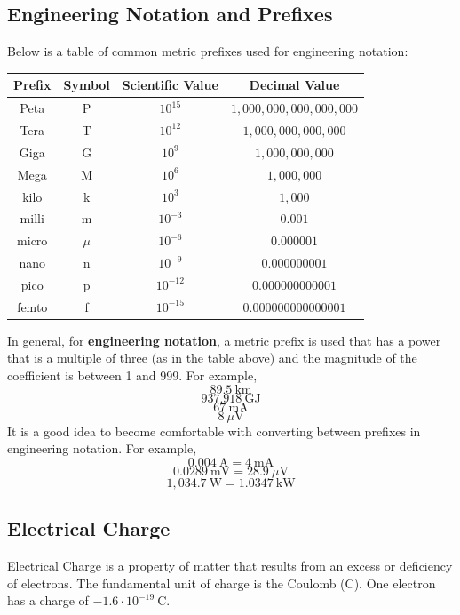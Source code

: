 \documentclass{article}
\begin{document}
\subsection{Engineering Notation and Prefixes}
Below is a table of common metric prefixes used for engineering notation: \\
\begin{center}
\begin{tabular}{| c | c | c | c |}
\hline
Prefix & Symbol & Scientific Value & Decimal Value \\
\hline
\hline
Peta & P & $10^{15}$ & $1,000,000,000,000,000$ \\
\hline
Tera & T & $10^{12}$ & $1,000,000,000,000$ \\
\hline
Giga & G & $10^{9}$ & $1,000,000,000$ \\
\hline
Mega & M & $10^{6}$ & $1,000,000$ \\
\hline
kilo & k & $10^{3}$ & $1,000$ \\
\hline
\hline
milli & m & $10^{-3}$ & $0.001$ \\
\hline
micro & $\mu$ & $10^{-6}$ & $0.000001$ \\
\hline
nano & n & $10^{-9}$ & $0.000000001$ \\
\hline
pico & p & $10^{-12}$ & $0.000000000001$ \\
\hline
femto & f & $10^{-15}$ & $0.000000000000001$ \\
\hline
\end{tabular}
\end{center}
In general, for \textbf{engineering notation}, a metric prefix is used that has a power that is a multiple of three (as in the table above) and the magnitude of the coefficient is between 1 and 999.
For example,
$$89.5 \ \textrm{km}$$
$$937.918 \ \textrm{GJ} $$
$$67 \ \textrm{mA} $$
$$8 \ \mu \textrm{V}$$
It is a good idea to become comfortable with converting between prefixes in engineering notation. For example,
$$0.004 \ \textrm{A} = 4 \ \textrm{mA}$$
$$0.0289 \ \textrm{mV} = 28.9 \ \mu \textrm{V}$$
$$1,034.7 \ \textrm{W} = 1.0347 \ \textrm{kW}$$
\subsection{Electrical Charge}
Electrical Charge is a property of matter that results from an excess or deficiency of electrons. The fundamental unit of charge is the Coulomb (C). One electron has a charge of $-1.6 \cdot 10^{-19} \ \textrm{C}$.
\end{document}
